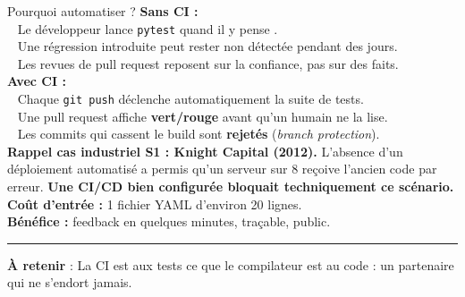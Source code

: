 \documentclass[aspectratio=169,11pt]{beamer}
\newcommand{\takeaway}[1]{%
\vfill\begin{beamercolorbox}[wd=\linewidth,sep=0.4em]{}
\color{accent2}\rule[0.6ex]{1.2em}{1.2pt}\hspace{0.4em}%
\textbf{\color{accent2}\small À retenir} \textcolor{textsoft}{:} %
{\small\color{textmain}#1}
\end{beamercolorbox}}
\newcommand{\oui}[1]{\textcolor{good}{\ding{51}}~#1}
\newcommand{\non}[1]{\textcolor{bad}{\ding{55}}~#1}
\begin{document}
\begin{frame}[t]{Pourquoi automatiser ?}
\footnotesize
\textbf{Sans CI :} \\[0.3em]
\non{} Le développeur lance \texttt{pytest} \og quand il y pense \fg{}.\\
\non{} Une régression introduite peut rester non détectée pendant des jours.\\
\non{} Les revues de pull request reposent sur la confiance, pas sur des faits.\\[0.5em]

\textbf{Avec CI :} \\[0.3em]
\oui{} Chaque \texttt{git push} déclenche automatiquement la suite de tests.\\
\oui{} Une pull request affiche \textbf{vert/rouge} avant qu'un humain ne la lise.\\
\oui{} Les commits qui cassent le build sont \textbf{rejetés} (\emph{branch protection}).\\[0.5em]

\textbf{Rappel cas industriel S1 : Knight Capital (2012).} L'absence d'un déploiement automatisé a permis qu'un serveur sur 8 reçoive l'ancien code par erreur. \textbf{Une CI/CD bien configurée bloquait techniquement ce scénario.}\\[0.4em]

\textbf{Coût d'entrée :} 1 fichier YAML d'environ 20 lignes.\\
\textbf{Bénéfice :} feedback en quelques minutes, traçable, public.
\takeaway{La CI est aux tests ce que le compilateur est au code : un partenaire qui ne s'endort jamais.}
\end{frame}
\end{document}
